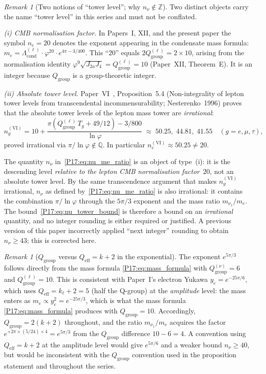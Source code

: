 \documentclass[11pt,a4paper]{article}
\theoremstyle{definition}\newtheorem{definition}[theorem]{Definition}
\theoremstyle{remark}
\newtheorem{remark}[theorem]{Remark}
\newcommand{\vp}{\varphi}
\newcommand{\Ja}{J_{2a}}
\newcommand{\Jfour}{J_4}
\newcommand{\Lcond}{\Lambda_{\mathrm{cond}}}
\begin{document}
\begin{remark}[Two notions of ``tower level''; why $n_\nu\notin\mathbb{Z}$]
\label{P17:rem:nconv}
Two distinct objects carry the name ``tower level'' in this series and
must not be conflated.

\emph{(i) CMB normalisation factor.}  In Papers~I, XII, and the present
paper the symbol $n_e=20$ denotes the exponent appearing in the condensate
mass formula: $m_e=\Lcond^{(\ell)}\cdot\vp^{20}\cdot e^{4\pi-3/400}$.  This
``20'' equals $2Q_{\mathrm{group}}^{(\ell)}=2\times10$, arising from the
normalisation identity $\vp^9\sqrt{\Ja\Jfour}=Q_{\mathrm{group}}^{(\ell)}=10$
(Paper~XII, Theorem~E).  It is an integer because $Q_{\mathrm{group}}$
is a group-theoretic integer.

\emph{(ii) Absolute tower level.}  Paper~VI~\cite{Paper6},
Proposition~5.4 (Non-integrality of lepton tower levels from
transcendental incommensurability; Nesterenko~1996) proves that the
absolute tower levels of the
lepton mass tower are \emph{irrational}:
\[
  n_g^{\mathrm{(VI)}} = 10 + \frac{\pi(Q_{\mathrm{group}}^{(\ell)}\,T_g + 49/12)
  - 3/800}{\ln\vp}
  \;\approx\; 50.25,\;44.81,\;41.55
  \quad (g=e,\mu,\tau),
\]
proved irrational via $\pi/\ln\vp\notin\mathbb{Q}$.  In particular
$n_e^{\mathrm{(VI)}}\approx50.25\neq20$.

The quantity $n_\nu$ in~\eqref{P17:eq:nu_me_ratio} is an object of type~(i):
it is the descending level \emph{relative to the lepton CMB normalisation
factor~$20$}, not an absolute tower level.  By the same transcendence
argument that makes $n_g^{\mathrm{(VI)}}$ irrational, $n_\nu$ as defined
by~\eqref{P17:eq:nu_me_ratio} is also irrational: it contains the combination
$\pi/\ln\vp$ through the $5\pi/3$ exponent and the mass ratio
$m_{\nu_1}/m_e$.  The bound~\eqref{P17:eq:nu_tower_bound} is therefore a
bound on an \emph{irrational} quantity, and no integer rounding is either
required or justified.  A previous version of this paper incorrectly
applied ``next integer'' rounding to obtain $n_\nu\geq43$; this is
corrected here.
\end{remark}

\begin{remark}[$Q_{\mathrm{group}}$ versus $Q_{\mathrm{eff}}=k+2$ in the exponential]
\label{P17:rem:Qgroup_vs_Qeff}
The exponent $e^{5\pi/3}$ follows directly from the mass formula
\eqref{P17:eq:mass_formula} with $Q_{\mathrm{group}}^{(\nu)}=6$ and
$Q_{\mathrm{group}}^{(\ell)}=10$.  This is consistent with Paper~I's
electron Yukawa $y_e=e^{-25\pi/6}$, which uses
$Q_{\mathrm{eff}}=k_\ell+2=5$ (half the Q-group) at the
\emph{amplitude} level: the mass enters as $m_e\propto y_e^2
=e^{-25\pi/3}$, which is what the mass formula
\eqref{P17:eq:mass_formula} produces with $Q_{\mathrm{group}}=10$.
Accordingly, $Q_{\mathrm{group}}=2(k+2)$ throughout, and the ratio
$m_{\nu_1}/m_e$ acquires the factor $e^{+2\pi\times(5/24)\times4}
=e^{5\pi/3}$ from the $Q_{\mathrm{group}}$ difference $10-6=4$.
A convention using $Q_{\mathrm{eff}}=k+2$ at the amplitude level
would give $e^{5\pi/6}$ and a weaker bound $n_\nu\geq40$, but would
be inconsistent with the $Q_{\mathrm{group}}$ convention used in the
proposition statement and throughout the series.
\end{remark}
\end{document}
